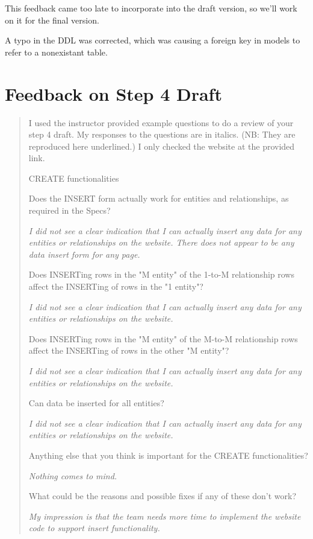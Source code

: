 \documentclass[11pt,letterpaper,oneside]{amsart}
\begin{document}
This feedback came too late to incorporate into the draft version, so we'll work on it for the final version.

A typo in the DDL was corrected, which was causing a foreign key in models to refer to a nonexistant table.


\section*{Feedback on Step 4 Draft}

\begin{quotation}

I used the instructor provided example questions to do a review of your step 4 draft. My responses to the questions are in italics. (NB: They are reproduced here underlined.) I only checked the website at the provided link.
 
CREATE functionalities

Does the INSERT form actually work for entities and relationships, as required in the Specs?

\emph{I did not see a clear indication that I can actually insert any data for any entities or relationships on the website. There does not appear to be any data insert form for any page.}

Does INSERTing rows in the "M entity" of the 1-to-M relationship rows affect the INSERTing of rows in the "1 entity"?

\emph{I did not see a clear indication that I can actually insert any data for any entities or relationships on the website.}

Does INSERTing rows in the "M entity" of the M-to-M relationship rows affect the INSERTing of rows in the other "M entity"?

\emph{I did not see a clear indication that I can actually insert any data for any entities or relationships on the website.}

Can data be inserted for all entities?

\emph{I did not see a clear indication that I can actually insert any data for any entities or relationships on the website.}

Anything else that you think is important for the CREATE functionalities?

\emph{Nothing comes to mind.}

What could be the reasons and possible fixes if any of these don't work?

\emph{My impression is that the team needs more time to implement the website code to support insert functionality.}


\end{quotation}
\end{document}
